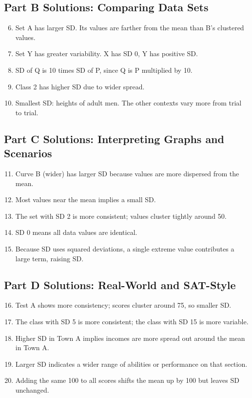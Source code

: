 \documentclass[14pt]{extarticle}
\begin{document}
\subsection*{Part B Solutions: Comparing Data Sets}
\begin{enumerate}
  \setcounter{enumi}{5}
  \item Set A has larger SD. Its values are farther from the mean than B’s clustered values.
  \item Set Y has greater variability. X has SD 0, Y has positive SD.
  \item SD of Q is 10 times SD of P, since Q is P multiplied by 10.
  \item Class 2 has higher SD due to wider spread.
  \item Smallest SD: heights of adult men. The other contexts vary more from trial to trial.
\end{enumerate}

\subsection*{Part C Solutions: Interpreting Graphs and Scenarios}
\begin{enumerate}
  \setcounter{enumi}{10}
  \item Curve B (wider) has larger SD because values are more dispersed from the mean.
  \item Most values near the mean implies a small SD.
  \item The set with SD 2 is more consistent; values cluster tightly around 50.
  \item SD 0 means all data values are identical.
  \item Because SD uses squared deviations, a single extreme value contributes a large term, raising SD.
\end{enumerate}

\subsection*{Part D Solutions: Real-World and SAT-Style}
\begin{enumerate}
  \setcounter{enumi}{15}
  \item Test A shows more consistency; scores cluster around 75, so smaller SD.
  \item The class with SD 5 is more consistent; the class with SD 15 is more variable.
  \item Higher SD in Town A implies incomes are more spread out around the mean in Town A.
  \item Larger SD indicates a wider range of abilities or performance on that section.
  \item Adding the same 100 to all scores shifts the mean up by 100 but leaves SD unchanged.
\end{enumerate}




\end{document}
